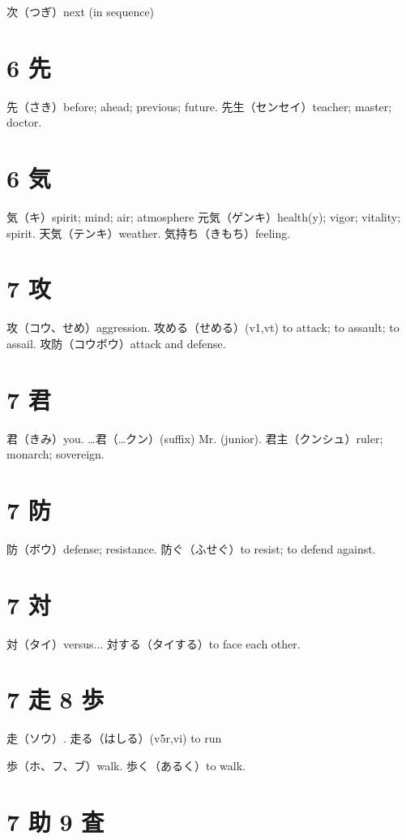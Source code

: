 次（つぎ）next (in sequence)

\section{6 先}

先（さき）before; ahead; previous; future.
先生（センセイ）teacher; master; doctor.

\section{6 気}

気（キ）spirit; mind; air; atmosphere
元気（ゲンキ）health(y); vigor; vitality; spirit.
天気（テンキ）weather.
気持ち（きもち）feeling.

\section{7 攻}

攻（コウ、せめ）aggression.
攻める（せめる）(v1,vt) to attack; to assault; to assail.
攻防（コウボウ）attack and defense.

\section{7 君}

君（きみ）you.
…君（…クン）(suffix) Mr. (junior).
君主（クンシュ）ruler; monarch; sovereign.

\section{7 防}

防（ボウ）defense; resistance.
防ぐ（ふせぐ）to resist; to defend against.

\section{7 対}

対（タイ）versus...
対する（タイする）to face each other.

\section{7 走 8 歩}

走（ソウ）.
走る（はしる）(v5r,vi) to run

歩（ホ、フ、ブ）walk.
歩く（あるく）to walk.

\section{7 助 9 査}


